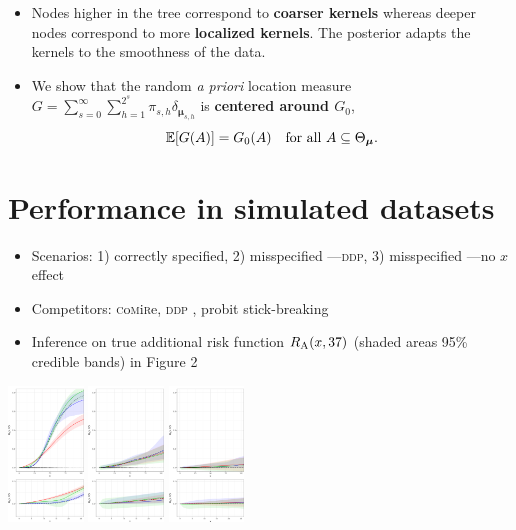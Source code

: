 \documentclass[a0,portrait]{a0poster}
\newcommand{\comirep}{\textsc{c}o\textsc{m}i\textsc{r}e}
\begin{document}
\begin{multicols}{2}
\begin{itemize}
\item Nodes higher in the tree correspond to \textbf{coarser kernels} whereas deeper nodes correspond to more \textbf{localized kernels}.
    The posterior adapts the kernels to the smoothness of the data.
\item We show that the random \textit{a priori} location measure $G = \sum_{s=0}^{\infty }\sum_{h=1}^{2^s} \pi_{s,h} \delta_{\bm{\mu}_{s,h}}$ is \textbf{centered around $ G_0$},
    \[
        \mathbb{E}[G(A)] = G_0(A)\quad \text{for all $ A \subseteq \Theta_{\bm{\mu}}$}.
    \]
    

\end{itemize}
\color{DarkRed}
\vspace{-0.3cm}

\color{DarkRed}
\section*{Performance in simulated datasets}
\color{Black}
\begin{itemize}
\item Scenarios: 1) correctly specified, 2) misspecified ---\textsc{ddp}, 3) misspecified ---no $x$ effect
\item Competitors: {\color{blue} \comirep}, {\color{red}\textsc{ddp}} \citep{deio:etal}, {\color{green} probit stick-breaking} \citep{rodriguez:2011}
\item Inference on true additional risk function  $R_{\mbox{\textsc{a}}}(x,37)$ (shaded areas 95\% credible bands) in Figure 2
\end{itemize}

 \begin{center}\vspace{1cm}
\includegraphics[width=0.15\textwidth]{risk1_37}
\includegraphics[width=0.15\textwidth]{risk2_37}
\includegraphics[width=0.15\textwidth]{risk3_37}
\end{center}


\end{multicols}
\end{document}
